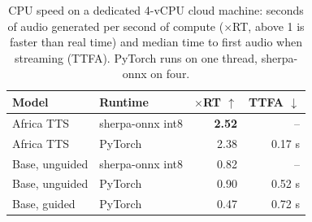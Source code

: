 \begin{table}[t]
\centering
\small
\begin{tabular}{llrr}
\toprule
\textbf{Model} & \textbf{Runtime} & \textbf{$\times$RT} $\uparrow$ & \textbf{TTFA} $\downarrow$ \\
\midrule
Africa TTS & sherpa-onnx int8 & \textbf{2.52} & -- \\
Africa TTS & PyTorch & 2.38 & 0.17 s \\
Base, unguided & sherpa-onnx int8 & 0.82 & -- \\
Base, unguided & PyTorch & 0.90 & 0.52 s \\
Base, guided & PyTorch & 0.47 & 0.72 s \\
\bottomrule
\end{tabular}
\caption{CPU speed on a dedicated 4-vCPU cloud machine: seconds of audio generated per second of compute ($\times$RT, above 1 is faster than real time) and median time to first audio when streaming (TTFA). PyTorch runs on one thread, sherpa-onnx on four.}
\label{tab:speed}
\end{table}
